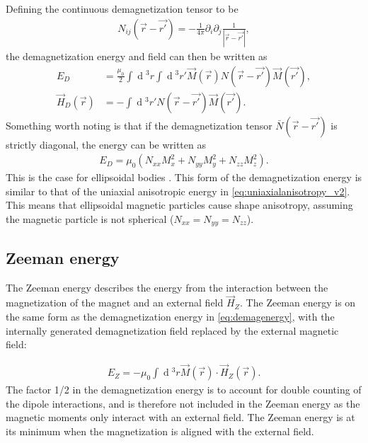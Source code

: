\documentclass[12pt, a4paper, twoside, openright]{article}		%
\renewcommand{\d}[1]{\ensuremath{\operatorname{d}\!{#1}}}
\numberwithin{equation}{section}
\begin{document}
Defining the continuous demagnetization tensor to be
\begin{align}
N_{ij}(\vec{r}-\vec{r'}) = -\frac{1}{4\pi}\partial_i\partial_j \frac{1}{|\vec{r}-\vec{r'}|},
\end{align}
the demagnetization energy and field can then be written as
\begin{align}
E_D &= \frac{\mu_0}{2} \int \d {^3}r \int \d {^3}r' \vec{M}(\vec{r}) N(\vec{r}-\vec{r'})\vec{M}(\vec{r'}), \\
\vec{H}_D(\vec{r}) &= - \int \d {^3}r' N(\vec{r}-\vec{r'})\vec{M}(\vec{r'}).
\end{align}
Something worth noting is that if the demagnetization tensor $\bar{N}(\vec{r}-\vec{r'})$ is strictly diagonal, the energy can be written as
\begin{align}
E_D = \mu_0(N_{xx}M_x^2+N_{yy}M_y^2+N_{zz}M_z^2).
\end{align}
This is the case for ellipsoidal bodies \cite{kruger2006current}. This form of the demagnetization energy is similar to that of the uniaxial anisotropic energy in \eqref{eq:uniaxialanisotropy_v2}. This means that ellipsoidal magnetic particles cause shape anisotropy, assuming the magnetic particle is not spherical ($N_{xx} = N_{yy} = N_{zz}$).


\subsection{Zeeman energy}
The Zeeman energy describes the energy from the interaction between the magnetization of the magnet and an external field $\vec{H}_{Z}$. The Zeeman energy is on the same form as the demagnetization energy in \eqref{eq:demagenergy}, with the internally generated demagnetization field replaced by the external magnetic field:

\begin{align}
\label{eq:zeemanenergy}
E_Z = -\mu_0\int \d {^3}r \vec{M}(\vec{r})\cdot\vec{H}_{Z}(\vec{r}).
\end{align}
The factor 1/2 in the demagnetization energy is to account for double counting of the dipole interactions, and is therefore not included in the Zeeman energy as the magnetic moments only interact with an external field. The Zeeman energy is at its minimum when the magnetization is aligned with the external field.
\end{document}
